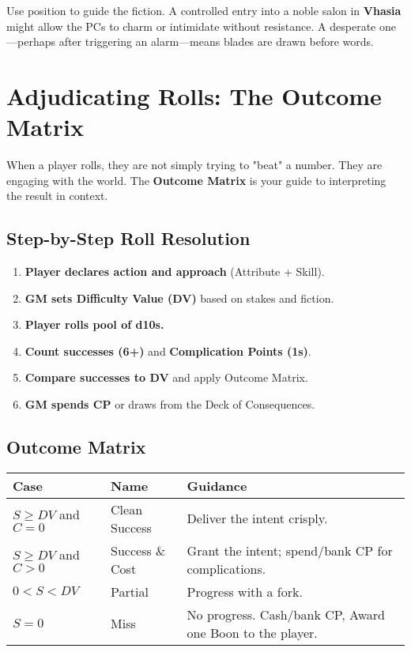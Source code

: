 Use position to guide the fiction. A controlled entry into a noble salon in \textbf{Vhasia} might allow the PCs to charm or intimidate without resistance. A desperate one---perhaps after triggering an alarm---means blades are drawn before words.

\section*{Adjudicating Rolls: The Outcome Matrix}

When a player rolls, they are not simply trying to "beat" a number. They are engaging with the world. The \textbf{Outcome Matrix} is your guide to interpreting the result in context.

\subsection*{Step-by-Step Roll Resolution}

\begin{enumerate}
    \item \textbf{Player declares action and approach} (Attribute + Skill).
    \item \textbf{GM sets Difficulty Value (DV)} based on stakes and fiction.
    \item \textbf{Player rolls pool of d10s.}
    \item \textbf{Count successes (6+)} and \textbf{Complication Points (1s)}.
    \item \textbf{Compare successes to DV} and apply Outcome Matrix.
    \item \textbf{GM spends CP} or draws from the Deck of Consequences.
\end{enumerate}

\subsection*{Outcome Matrix}

\begin{center}
\begin{tabular}{lll}
\toprule
\textbf{Case} & \textbf{Name} & \textbf{Guidance} \\
\midrule
$S \geq DV$ and $C = 0$ & Clean Success\index{Clean Success} & Deliver the intent crisply. \\
$S \geq DV$ and $C > 0$ & Success \& Cost\index{Success \& Cost} & Grant the intent; spend/bank CP for complications. \\
$0 < S < DV$ & Partial\index{Partial} & Progress with a fork. \\
	$S = 0$ & Miss\index{Miss} & No progress. Cash/bank CP, Award one Boon\index{Boon!aquiring} to the player. \\
\bottomrule
\end{tabular}
\end{center}

